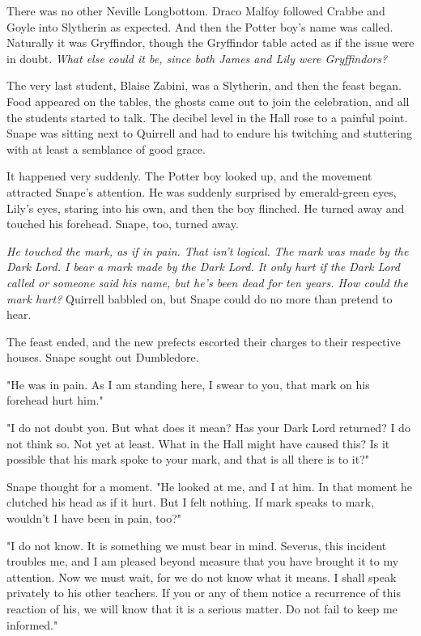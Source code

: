\documentclass[a4paper,11pt]{article}
\begin{document}
There was no other Neville Longbottom. Draco Malfoy followed Crabbe and Goyle into Slytherin as expected. And then the Potter boy's name was called. Naturally it was Gryffindor, though the Gryffindor table acted as if the issue were in doubt. \emph{What else could it be, since both James and Lily were Gryffindors?}

The very last student, Blaise Zabini, was a Slytherin, and then the feast began. Food appeared on the tables, the ghosts came out to join the celebration, and all the students started to talk. The decibel level in the Hall rose to a painful point. Snape was sitting next to Quirrell and had to endure his twitching and stuttering with at least a semblance of good grace.

It happened very suddenly. The Potter boy looked up, and the movement attracted Snape's attention. He was suddenly surprised by emerald-green eyes, Lily's eyes, staring into his own, and then the boy flinched. He turned away and touched his forehead. Snape, too, turned away.

\emph{He touched the mark, as if in pain. That isn't logical. The mark was made by the Dark Lord. I bear a mark made by the Dark Lord. It only hurt if the Dark Lord called or someone said his name, but he's been dead for ten years. How could the mark hurt?} Quirrell babbled on, but Snape could do no more than pretend to hear.

The feast ended, and the new prefects escorted their charges to their respective houses. Snape sought out Dumbledore.

"He was in pain. As I am standing here, I swear to you, that mark on his forehead hurt him."

"I do not doubt you. But what does it mean? Has your Dark Lord returned? I do not think so. Not yet at least. What in the Hall might have caused this? Is it possible that his mark spoke to your mark, and that is all there is to it?"

Snape thought for a moment. "He looked at me, and I at him. In that moment he clutched his head as if it hurt. But I felt nothing. If mark speaks to mark, wouldn't I have been in pain, too?"

"I do not know. It is something we must bear in mind. Severus, this incident troubles me, and I am pleased beyond measure that you have brought it to my attention. Now we must wait, for we do not know what it means. I shall speak privately to his other teachers. If you or any of them notice a recurrence of this reaction of his, we will know that it is a serious matter. Do not fail to keep me informed."
\end{document}
